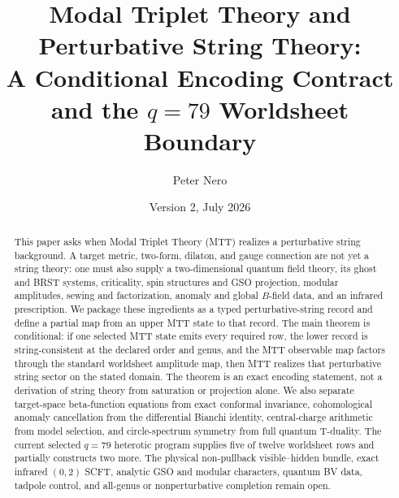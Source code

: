 \documentclass[11pt]{article}
\title{\vspace{-1em}
Modal Triplet Theory and Perturbative String Theory:\\[0.25em]
\large A Conditional Encoding Contract and the \(q=79\) Worldsheet Boundary}
\author{Peter Nero}
\date{Version 2, July 2026}
\theoremstyle{definition}
\theoremstyle{remark}
\begin{document}
\maketitle

\begin{abstract}
This paper asks when Modal Triplet Theory (MTT) realizes a perturbative string
background.  A target metric, two-form, dilaton, and gauge connection are not
yet a string theory: one must also supply a two-dimensional quantum field
theory, its ghost and BRST systems, criticality, spin structures and GSO
projection, modular amplitudes, sewing and factorization, anomaly and global
\(B\)-field data, and an infrared prescription.  We package these ingredients
as a typed perturbative-string record and define a partial map from an upper
MTT state to that record.  The main theorem is conditional: if one selected
MTT state emits every required row, the lower record is string-consistent at
the declared order and genus, and the MTT observable map factors through the
standard worldsheet amplitude map, then MTT realizes that perturbative string
sector on the stated domain.  The theorem is an exact encoding statement, not
a derivation of string theory from saturation or projection alone.  We also
separate target-space beta-function equations from exact conformal
invariance, cohomological anomaly cancellation from the differential Bianchi
identity, central-charge arithmetic from model selection, and circle-spectrum
symmetry from full quantum T-duality.  The current selected \(q=79\) heterotic
program supplies five of twelve worldsheet rows and partially constructs two
more.  The physical non-pullback visible--hidden bundle, exact infrared
\((0,2)\) SCFT, analytic GSO and modular characters, quantum BV data, tadpole
control, and all-genus or nonperturbative completion remain open.
\end{abstract}
\end{document}
